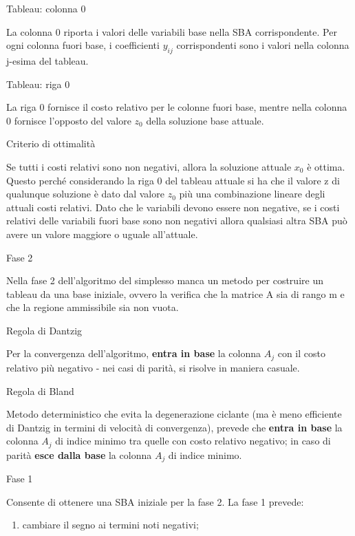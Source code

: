 \documentclass[answers, a4paper, 11pt]{exam}
\begin{document}
\begin{questions}
\question Tableau: colonna 0 
\begin{solution}
La colonna 0 riporta i valori delle variabili base nella SBA corrispondente. Per ogni colonna fuori base, i coefficienti $y_{ij}$ corrispondenti sono i valori nella colonna j-esima del tableau.
\end{solution}
\question Tableau: riga 0 
\begin{solution}
La riga 0 fornisce il costo relativo per le colonne fuori base, mentre nella colonna 0 fornisce l'opposto del valore $z_{0}$ della soluzione base attuale.
\end{solution}
\question Criterio di ottimalità
\begin{solution}
Se tutti i costi relativi sono non negativi, allora la soluzione attuale $x_{0}$ è ottima. Questo perché considerando la riga 0 del tableau attuale si ha che il valore z di qualunque soluzione è dato dal valore $z_{0}$ più una combinazione lineare degli attuali costi relativi. Dato che le variabili devono essere non negative, se i costi relativi delle variabili fuori base sono non negativi allora qualsiasi altra SBA può avere un valore maggiore o uguale all'attuale.
\end{solution}
\question Fase 2
\begin{solution}
Nella fase 2 dell'algoritmo del simplesso manca un metodo per costruire un tableau da una base iniziale, ovvero la verifica che la matrice A sia di rango m e che la regione ammissibile sia non vuota. 
\end{solution}
\question Regola di Dantzig
\begin{solution}
Per la convergenza dell'algoritmo, \textbf{entra in base} la colonna $A_{j}$ con il costo relativo più negativo - nei casi di parità, si risolve in maniera casuale. 
\end{solution}
\question Regola di Bland
\begin{solution}
Metodo deterministico che evita la degenerazione ciclante (ma è meno efficiente di Dantzig in termini di velocità di convergenza), prevede che \textbf{entra in base} la colonna $A_{j}$ di indice minimo tra quelle con costo relativo negativo; in caso di parità \textbf{esce dalla base} la colonna $A_{j}$ di indice minimo.
\end{solution}
\question Fase 1
\begin{solution}
Consente di ottenere una SBA iniziale per la fase 2. La fase 1 prevede:
\begin{enumerate}
\item cambiare il segno ai termini noti negativi;

\end{enumerate}
\end{solution}
\end{questions}
\end{document}
